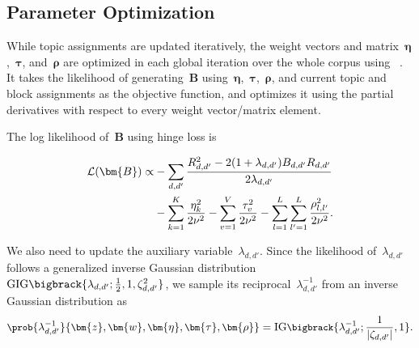 \subsection{Parameter Optimization}
\label{ssec:opt}

While topic assignments are updated iteratively, the weight vectors
and matrix~$\bm{\eta}$,~$\bm{\tau}$, and~$\bm{\rho}$ are optimized in
each global iteration over the whole corpus using
\lbfgs~\cite{liu-1989-lbfgs}. It takes the likelihood of generating~$\bm{B}$ using~$\bm{\eta}$,~$\bm{\tau}$,~$\bm{\rho}$, and current topic
and block assignments as the objective function, and optimizes it
using the partial derivatives with respect to every weight
vector/matrix element.















The log likelihood of~$\bm{B}$ using hinge loss is\par\nobreak
\begin{small}
\begin{align}
\mathcal{L} (\bm{B}) \propto& -\sum_{d,d'} \frac{R_{d,d'}^2 - 2(1+\lambda_{d,d'})B_{d,d'}R_{d,d'}}{2\lambda_{d,d'}} \notag\\
&- \sum_{k=1}^{K} \frac{\eta_k^2}{2\nu^2} - \sum_{v=1}^{V} \frac{\tau_v^2}{2\nu^2} - \sum_{l=1}^{L} \sum_{l'=1}^{L} \frac{\rho_{l,l'}^2}{2\nu^2}.
\end{align}
\end{small}

We also need to update the auxiliary variable~$\lambda_{d,d'}$.  Since
the likelihood of~$\lambda_{d,d'}$ follows a generalized inverse
Gaussian distribution $\mathrm{GIG} \bigbrack{\lambda_{d,d'};
  \frac{1}{2}, 1, \zeta_{d,d'}^2}$, we sample its reciprocal~$\lambda_{d,d'}^{-1}$ from an inverse Gaussian distribution as
\begin{equation}\label{equ:lambda}
\small
\prob{\lambda_{d,d'}^{-1}}{\bm{z}, \bm{w}, \bm{\eta}, \bm{\tau}, \bm{\rho}} = \mathrm{IG} \bigbrack{\lambda_{d,d'}^{-1}; \frac{1}{|\zeta_{d,d'}|}, 1}.
\end{equation}
